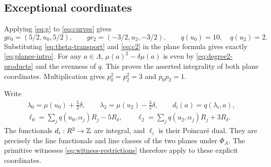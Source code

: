 \subsection{Exceptional coordinates}
Applying \eqref{eq:g} to \eqref{eq:curves} gives
\begin{equation}\label{eq:gc}
 gc_0=(5/2,u_0,5/2),\qquad
 gc_2=(-3/2,u_2,-3/2),\qquad q(u_0)=10,\quad q(u_2)=2.
\end{equation}
Substituting \eqref{eq:theta-transport} and \eqref{eq:c2}
in the plane formula gives exactly
\eqref{eq:planes-intro}. For any $a\in\Lambda$,
$\mu(a)^2-\delta\mu(a)$ is even by
\eqref{eq:degree2-products} and the evenness of $q$.
This proves the asserted integrality of both plane coordinates.
Multiplication gives $p_0^2=p_2^2=3$ and $p_0p_2=1$.

Write
\begin{equation}\label{eq:d-ell}
 \begin{gathered}
 \lambda_0=\mu(u_0)+\tfrac52\delta,\qquad
 \lambda_2=\mu(u_2)-\tfrac32\delta,\qquad d_i(a)=q(\lambda_i,a),\\
 \ell_0=\sum_jq(u_0,\alpha_j)R_j-5R_\delta,\qquad
 \ell_2=\sum_jq(u_2,\alpha_j)R_j+3R_\delta.
 \end{gathered}
\end{equation}
The functionals $d_i:R^2\to\mathbb Z$ are integral, and $\ell_i$
is their Poincar\'e dual. They are precisely the line
functionals and line classes of the two planes under $\Phi_A$.
The primitive witnesses \eqref{eq:witness-restrictions}
therefore apply to these explicit coordinates.
